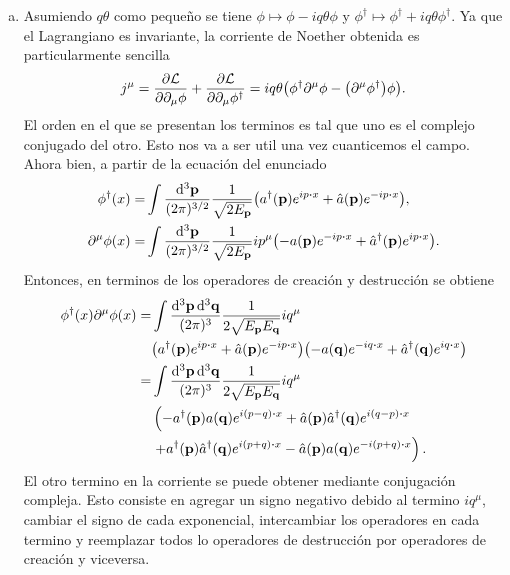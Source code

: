 \documentclass{article}
\begin{document}
\begin{enumerate}[(a)]
\item Asumiendo $q\theta$ como pequeño se tiene $\phi\mapsto\phi-iq\theta\phi$ y $\phi^\dagger\mapsto\phi^\dagger+iq\theta\phi^\dagger$. Ya que el Lagrangiano es invariante, la corriente de Noether obtenida es particularmente sencilla
\begin{equation}\label{ec:corriente_escalar}
j^\mu=\pdv{\mathcal{L}}{\partial_\mu\phi} (-iq\theta\phi)+\pdv{\mathcal{L}}{\partial_\mu\phi^\dagger} (iq\theta\phi^\dagger)=iq\theta\qty(\phi^\dagger\partial^\mu\phi-\qty(\partial^\mu\phi^\dagger)\phi).
\end{equation}
El orden en el que se presentan los terminos es tal que uno es el complejo conjugado del otro. Esto nos va a ser util una vez cuanticemos el campo. Ahora bien, a partir de la ecuación del enunciado
\begin{align}
\begin{split}
\phi^\dagger(x)=&\int\frac{\dd[3]{\vb{p}}}{(2\pi)^{3/2}}\frac{1}{\sqrt{2E_{\vb{p}}}}\qty(a^\dagger(\vb{p})e^{ip\vdot x}+\hat{a}(\vb{p})e^{-ip\vdot x}),\\
\partial^\mu\phi(x)=&\int\frac{\dd[3]{\vb{p}}}{(2\pi)^{3/2}}\frac{1}{\sqrt{2E_{\vb{p}}}}ip^\mu\qty(-a(\vb{p})e^{-ip\vdot x}+\hat{a}^\dagger(\vb{p})e^{ip\vdot x}).
\end{split}
\end{align}
Entonces, en terminos de los operadores de creación y destrucción se obtiene
\begin{align}\label{ec:corriente_escalar_1}
\begin{split}
\phi^\dagger(x)\partial^\mu\phi(x)=&\int\frac{\dd[3]{\vb{p}}\dd[3]{\vb{q}}}{(2\pi)^3}\frac{1}{2\sqrt{E_{\vb{p}}E_{\vb{q}}}}iq^\mu\\
&\qty(a^\dagger(\vb{p})e^{ip\vdot x}+\hat{a}(\vb{p})e^{-ip\vdot x})\qty(-a(\vb{q})e^{-iq\vdot x}+\hat{a}^\dagger(\vb{q})e^{iq\vdot x})\\
=&\int\frac{\dd[3]{\vb{p}}\dd[3]{\vb{q}}}{(2\pi)^3}\frac{1}{2\sqrt{E_{\vb{p}}E_{\vb{q}}}}iq^\mu\\
&\left(-a^\dagger(\vb{p})a(\vb{q})e^{i(p-q)\vdot x}+\hat{a}(\vb{p})\hat{a}^\dagger(\vb{q})e^{i(q-p)\vdot x}\right.\\
&\left.+a^\dagger(\vb{p})\hat{a}^\dagger(\vb{q})e^{i(p+q)\vdot x}-\hat{a}(\vb{p})a(\vb{q})e^{-i(p+q)\vdot x}\right).
\end{split}
\end{align}
El otro termino en la corriente se puede obtener mediante conjugación compleja. Esto consiste en agregar un signo negativo debido al termino $iq^\mu$, cambiar el signo de cada exponencial, intercambiar los operadores en cada termino y reemplazar todos lo operadores de destrucción por operadores de creación y viceversa.

\end{enumerate}
\end{document}
